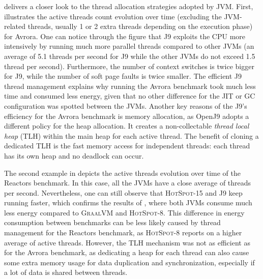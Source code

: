  delivers a closer look to the thread allocation strategies adopted by JVM.
First,  illustrates the active threads count evolution over time (excluding the JVM-related threads, usually 1 or 2 extra threads depending on the execution phase) for \textsf{Avrora}.
One can notice through the figure that \textsc{J9} exploits the CPU more intensively by running much more parallel threads compared to other JVMs (an average of 5.1 threads per second for \textsc{J9} while the other JVMs do not exceed 1.5 thread per second).
Furthermore, the number of context switches is twice bigger for \textsc{J9}, while the number of soft page faults is twice smaller.
The efficient \textsc{J9} thread management explains why running the \textsf{Avrora} benchmark took much less time and consumed less energy, given that no other difference for the JIT or GC configuration was spotted between the JVMs.
Another key reasons of the \textsc{J9}'s efficiency for the \textsf{Avrora} benchmark is memory allocation, as \textsf{OpenJ9} adopts a different policy for the heap allocation.
It creates a non-collectable \emph{thread local heap} (TLH) within the main heap for each active thread.
The benefit of cloning a dedicated TLH is the fast memory access for independent threads: each thread has its own heap and no deadlock can occur.

The second example in  depicts the active threads evolution over time of the \textsf{Reactors} benchmark.
In this case, all the JVMs have a close average of threads per second.
Nevertheless, one can still observe that \textsc{HotSpot-15} and \textsc{J9} keep running faster, which confirms the results of , where both JVMs consume much less energy compared to \textsc{GraalVM} and \textsc{HotSpot-8}.
This difference in energy consumption between benchmarks can be less likely caused by thread management for the \textsf{Reactors} benchmark, as \textsc{HotSpot-8} reports on a higher average of active threads.
However, the TLH mechanism was not as efficient as for the \textsf{Avrora} benchmark, as dedicating a heap for each thread can also cause some extra memory usage for data duplication and synchronization, especially if a lot of data is shared between threads.


